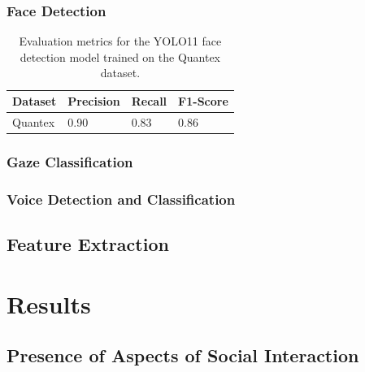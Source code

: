 \documentclass[
  man,floatsintext]{apa6}
\begin{document}
\subsubsection{Face Detection}\label{face-detection}

\begin{table}[tbp]

\begin{center}
\begin{threeparttable}

\caption{\label{tab:face-detection-metrics}Evaluation metrics for the YOLO11 face detection model trained on the Quantex dataset.}

\begin{tabular}{llll}
\toprule
Dataset & \multicolumn{1}{c}{Precision} & \multicolumn{1}{c}{Recall} & \multicolumn{1}{c}{F1-Score}\\
\midrule
Quantex & 0.90 & 0.83 & 0.86\\
\bottomrule
\end{tabular}

\end{threeparttable}
\end{center}

\end{table}

\subsubsection{Gaze Classification}\label{gaze-classification}

\subsubsection{Voice Detection and Classification}\label{voice-detection-and-classification}

\subsection{Feature Extraction}\label{feature-extraction}

\section{Results}\label{results}

\subsection{Presence of Aspects of Social Interaction}\label{presence-of-aspects-of-social-interaction}
\end{document}
